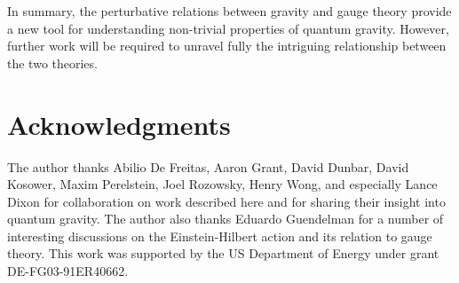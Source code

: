 In summary, the perturbative relations between gravity and gauge
theory provide a new tool for understanding non-trivial properties of
quantum gravity. However, further work will be required to unravel
fully the intriguing relationship between the two theories.


\section{Acknowledgments}
\label{section:acknowledgements}

The author thanks Abilio De Freitas, Aaron Grant, David Dunbar, David
Kosower, Maxim Perelstein, Joel Rozowsky, Henry Wong, and especially
Lance Dixon for collaboration on work described here and for sharing
their insight into quantum gravity.  The author also thanks Eduardo
Guendelman for a number of interesting discussions on the Einstein-Hilbert
action and its relation to gauge theory.  This work was supported by
the US Department of Energy under grant
DE-FG03-91ER40662.

\newpage



